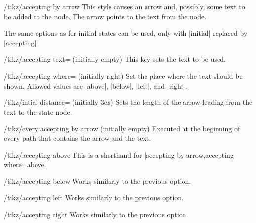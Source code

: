\begin{stylekey}{/tikz/accepting by arrow}
  This style causes an arrow and, possibly, some text to be added to
  the node. The arrow points to the text from the node.

  The same options as for initial states can be used, only with
  |initial| replaced by |accepting|:
  \begin{key}{/tikz/accepting text= (initially \normalfont empty)}
    This key sets the text to be used.
  \end{key}
  \begin{key}{/tikz/accepting where= (initially right)}
    Set the place where the text should be shown. Allowed values are
    |above|, |below|, |left|, and |right|.
  \end{key}
  \begin{key}{/tikz/intial distance= (initially 3ex)}
    Sets the length of the arrow leading from the text to the state
    node.
  \end{key}
  \begin{stylekey}{/tikz/every accepting by arrow (initially \normalfont empty)}
    Executed at the beginning of every path that contains
    the arrow and the text.
  \end{stylekey}  
\begin{codeexample}[]
\end{codeexample}
\end{stylekey}

\begin{stylekey}{/tikz/accepting above}
  This is a shorthand for |accepting by arrow,accepting where=above|.
\end{stylekey}
\begin{stylekey}{/tikz/accepting below}
  Works similarly to the previous option.
\end{stylekey}
\begin{stylekey}{/tikz/accepting left}
  Works similarly to the previous option.
\end{stylekey}
\begin{stylekey}{/tikz/accepting right}
  Works similarly to the previous option.
\end{stylekey}



